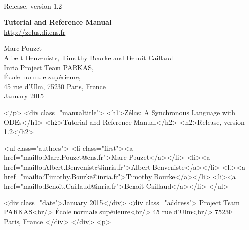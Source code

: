 \documentclass[11pt,titlepage,twoside]{report}
\begin{document}
\pagestyle{empty}

\vfill

\\[2ex]
{\Large Release, version 1.2}


\vspace{7cm}

\begin{center}
{\Huge \bf Tutorial and Reference Manual} \\

\vspace{1cm}
{\Large \url{http://zelus.di.ens.fr}}
\vspace{1.5cm}

{\Large Marc Pouzet} \\[2ex]
{\Large Albert Benveniste, Timothy Bourke and Benoit Caillaud} \\[4ex]
{\large Inria Project Team PARKAS, \\
\'Ecole normale sup\'erieure, \\ 45 rue d'Ulm,
75230 Paris, France} \\[2ex]
{\Large January 2015} \\

\end{center}
\begin{rawhtml}
</p>
<div class="manualtitle">
  <h1>Zélus: A Synchronous Language with ODEs</h1>
  <h2>Tutorial and Reference Manual</h2>
  <h2>Release, version 1.2</h2>

  <ul class="authors">
    <li class="first"><a href="mailto:Marc.Pouzet@ens.fr">Marc Pouzet</a></li>
    <li><a href="mailto:Albert.Benveniste@inria.fr">Albert Benveniste</a></li>
    <li><a href="mailto:Timothy.Bourke@inria.fr">Timothy Bourke</a></li>
    <li><a href="mailto:Benoit.Caillaud@inria.fr">Benoit Caillaud</a></li>
  </ul>

  <div class="date">January 2015</div>
  <div class="address">
    Project Team PARKAS<br/>
    École normale supérieure<br/>
    45 rue d'Ulm<br/>
    75230 Paris, France
  </div>
</div>
<p>
\end{rawhtml}

\newpage
\cleardoublepage
\tableofcontents
\cleardoublepage
\end{document}
